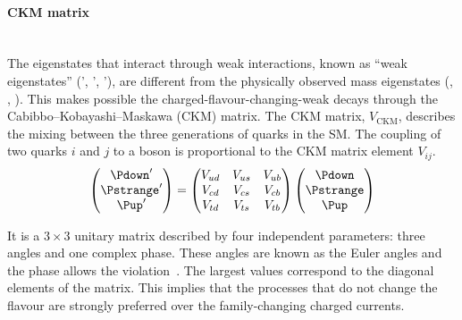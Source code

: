 

\paragraph{CKM matrix}\mbox{}\\
The eigenstates that interact through weak interactions, known as ``weak eigenstates'' 
(\Pdown', \Pstrange', \Pup'), are different from the physically observed mass eigenstates 
(\Pdown, \Pstrange , \Pup). This makes possible the charged-flavour-changing-weak decays
through the Cabibbo--Kobayashi--Maskawa (CKM) matrix.
The CKM matrix, $V_{\text{CKM}}$, describes the mixing between the three generations of quarks in the SM. 
The coupling of two quarks $i$ and $j$ to a \PW boson is proportional to the CKM matrix element $V_{ij}$.
\begin{equation*}
	\begin{pmatrix} \Pdown' \\ \Pstrange ' \\ \Pup ' \end{pmatrix}  = \begin{pmatrix} 	V_{ud} & V_{us} & V_{ub} \\
																V_{cd} & V_{cs} & V_{cb} \\ 
																V_{td}  & V_{ts}  & V_{tb} \end{pmatrix}
												 \begin{pmatrix} \Pdown \\ \Pstrange  \\ \Pup  \end{pmatrix}
\end{equation*}

It is a $3 \times 3$ unitary matrix described by four independent parameters: three angles and one complex phase. 
These angles are known as the Euler angles and the phase allows the \CP violation~\cite{Chau:1984fp}. 
The largest values correspond 
to the diagonal elements of the matrix.
This implies that the processes that do not change the flavour are strongly preferred over the 
family-changing charged currents. 

